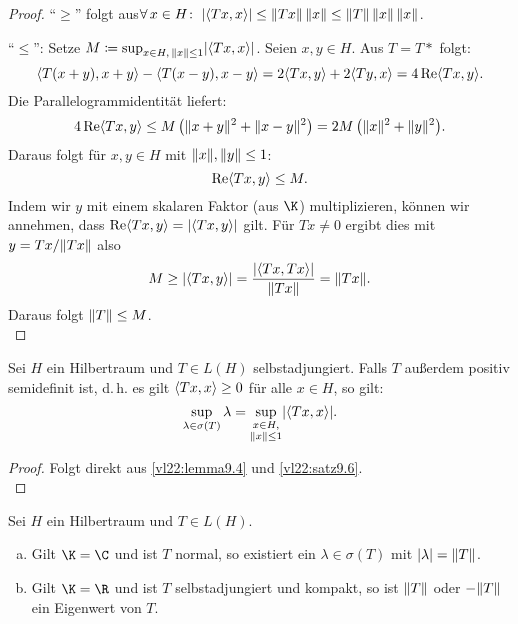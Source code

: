 \begin{proof}
    \enquote{$\geq$} folgt aus\quad $\forall\,x\in H\colon\;
    \abs{\SP{Tx,x}} \leq \norm{Tx}\, \norm{x}
    \leq \norm{T} \, \norm{x} \, \norm{x}$.
    
    \enquote{$\leq$}: Setze $M \defeq \sup_{x\in H,\,\norm{x}\leq1}
        \abs{\SP{Tx,x}}$. Seien $x,y\in H$. Aus $T=T*$ folgt:
        \[ \SP{T(x+y), x+y} - \SP{T(x-y), x-y} = 2 \SP{Tx,y} + 2 \SP{Ty,x}
            = 4 \Re\SP{Tx,y}
        . \]
        Die Parallelogrammidentität  liefert:
        \[ 4\Re\SP{Tx,y}
            \leq M \, \bigl( \norm{x+y}^2 + \norm{x-y}^2 \bigr)
            = 2M \, \bigl( \norm{x}^2 + \norm{y}^2 \bigr)
        . \]
        Daraus folgt für $x,y\in H$ mit $\lVert x\rVert,\lVert y\rVert\leq 1$:
        \[ \Re\SP{Tx,y} \leq M  . \]
        Indem wir $y$ mit einem skalaren Faktor (aus $\K$) multiplizieren,
        können wir annehmen, dass $\Re\SP{Tx,y} = \abs{\SP{Tx,y}}$ gilt.
        Für $Tx\neq0$ ergibt dies mit $y = Tx/\lVert Tx\rVert$ also
        \[ M \geq \abs{\SP{Tx,y}} = \frac{\abs{\SP{Tx,Tx}}}{\norm{Tx}}
            = \norm{Tx}
        . \]
        Daraus folgt $\lVert T\rVert\leq M$.
        \\
\end{proof}

\begin{thKorollar}
    Sei $H$ ein Hilbertraum und $T\in L(H)$ selbstadjungiert. Falls $T$ außerdem
    positiv semidefinit ist, d.\,h. es gilt $\SP{Tx,x} \geq 0$ für alle $x\in H$, so gilt:
    \[ \sup_{\lambda\in\sigma(T)} \lambda
        = \sup_{\substack{x\in H,\\\norm{x}\leq1}} \abs{\SP{Tx,x}}  
    . \]
\end{thKorollar}

\begin{proof}
    Folgt direkt aus \cref{vl22:lemma9.4} und \cref{vl22:satz9.6}.
    \\
\end{proof}

\begin{thLemma} \label{vl23:lemma9.8}
    Sei $H$ ein Hilbertraum und $T\in L(H)$.
    \begin{enumerate}[(a)]
        \item
            Gilt $\K=\C$ und ist $T$ normal, so existiert ein
            $\lambda\in\sigma(T)$ mit $\lvert\lambda\rvert = \lVert T\rVert$.
            
        \item
            Gilt $\K=\R$ und ist $T$ selbstadjungiert und kompakt, so ist
            $\lVert T\rVert$ oder $-\lVert T\rVert$ ein Eigenwert von $T$.
    \end{enumerate}
\end{thLemma}


